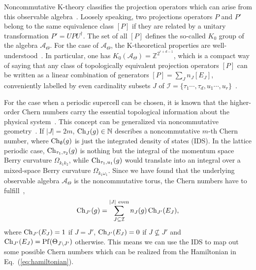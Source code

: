 \documentclass[
    10pt,
    aps,
    prl,
    twocolumn,
    floatfix,
    superscriptaddress
]{revtex4-2}
\newcommand{\SupplementalMaterial}{\cite{Note1}}
\newcommand{\revise}[1]{{\color{blue}#1}}
\begin{document}
\revise{
Noncommutative K-theory classifies the projection operators which can arise from this observable algebra~\cite{Park2008,Blackadar1998, Connes1994}.
Loosely speaking, two projections operators $P$ and $P'$ belong to the same equivalence class $[P]$ if they are related by a unitary transformation $P' = U P U^\dagger $. 
The set of all $[P]$ defines the so-called $K_0$ group of the algebra $\mathcal{A}_\Theta$.
For the case of $\mathcal{A}_\Theta$, the K-theoretical properties are well-understood~\cite{Prodan2016}.
In particular, one has $K_0( \mathcal{A}_\Theta) = \mathbb{Z}^{2^{r+d-1}}$, which is a compact way of saying that any class of topologically equivalent projection operators $[P]$ can be written as a linear combination of generators $[P] =\sum_J n_J [E_J]$, conveniently labelled by even cardinality subsets $J$ of $\mathcal{I}=\lbrace \tau_1 \cdots, \tau_d, u_1  \cdots, u_r \rbrace$~\SupplementalMaterial.
}

\revise{
For the case when a periodic supercell can be chosen, it is known that the higher-order Chern numbers carry the essential topological information about the physical system~\cite{Qi2008,Kraus2013}.
This concept can be generalized via noncommutative geometry~\cite{Liu2020, Prodan2016}.
If $|J| = 2 m $, ${\rm Ch}_{J} (g) \in \mathbb{N}$ describes a noncommutative $m$-th Chern number, where  ${\rm Ch}_{\emptyset} (g)$ is just the integrated density of states (IDS).
In the lattice periodic case, ${\rm Ch}_{{\tau_1, \tau_2}} (g)$ is nothing but the integral of the momentum space Berry curvature $\Omega_{k_1 k_2}$, while ${\rm Ch}_{{\tau_1, u_1}} (g)$ would translate into an integral over a mixed-space Berry curvature $\Omega_{k_1 \omega_1}$.
Since we have found that the underlying observable algebra $\mathcal{A}_\Theta$ is the noncommutative torus, the Chern numbers have to fulfill~\cite{Prodan2016},
\begin{equation}
   {\rm Ch}_{J'} (g) =  \sum_{J \subseteq \mathcal{I} }^{|J|~\mathrm{even}}  n_J(g) \, {\rm Ch}_{J'}(E_J),
   \label{eq:chern_expansion}
\end{equation}
where ${\rm Ch}_{J'}(E_J)=1$ if $J=J'$,  ${\rm Ch}_{J'}(E_J)=0$ if $J \not\subseteq J'$ and ${\rm Ch}_{J'}(E_J) = \mathrm{Pf}( \Theta_{J\setminus J'})$ otherwise.
This means we can use the IDS to map out some possible Chern numbers which can be realized from the Hamiltonian in Eq.~(\ref{eq:hamiltonian}).
}
\end{document}
